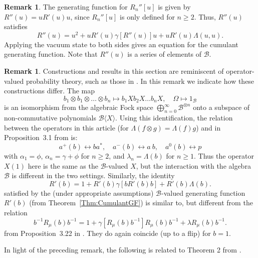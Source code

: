 \documentclass[12pt]{amsart}
\theoremstyle{definition}
\newtheorem{Remark}[Thm]{Remark}
\newcommand{\mc}[1]{\mathcal{#1}}
\begin{document}
\begin{Remark}
The generating function for $R_n''[u]$ is given by $R''(u) = uR'(u) u$, since $R_n''[u]$ is only defined for $n\geq 2$. Thus, $R''(u)$ satisfies
	\begin{equation}
	R''(u) = u^2 + u R'(u) \gamma\left[ R''(u) \right] u + u R'(u) \Lambda(u, u).
	\end{equation}
	Applying the vacuum state to both sides gives an equation for the cumulant generating function. Note that $R''(u)$ is a series of elements of $\mc{B}$.
\end{Remark}


\begin{Remark}\label{Rmk:Ans-Williams-Jacobi-comparison}
Constructions and results in this section are reminiscent of operator-valued probability theory, such as those in \cite{Ans-Williams-Jacobi}. In this remark we indicate how these constructions differ. The map
\[
b_1 \otimes b_1 \otimes \ldots \otimes b_n \mapsto b_1 X b_2 X \ldots b_n X, \quad \Omega \mapsto 1_{\mc{B}}
\]
is an isomorphism from the algebraic Fock space $\bigoplus_{n=0}^\infty \mc{B}^{\otimes n}$ onto a subspace of non-commutative polynomials $\mc{B} \langle X \rangle$. Using this identification, the relation between the operators in this article (for $\Lambda(f \otimes g) = \Lambda(f) g$) and in Proposition~3.1 from \cite{Ans-Williams-Jacobi} is:
\[
a^+(b) \leftrightarrow b a^\ast, \quad a^-(b) \leftrightarrow a \ b, \quad a^0(b) \leftrightarrow p
\]
with $\alpha_1 = \phi$, $\alpha_n = \gamma + \phi$ for $n \geq 2$, and $\lambda_n = \Lambda(b)$ for $n \geq 1$. Thus the operator $X(1)$ here is the same as the $\mc{B}$-valued $X$, but the interaction with the algebra $\mc{B}$ is different in the two settings. Similarly, the identity
\begin{equation*}
	R'(b) = 1 + R'(b)\gamma\left[ b R'(b)b \right] + R'(b) \Lambda(b).
	\end{equation*}
satisfied by the (under appropriate assumptions) $\mc{B}$-valued generating function $R'(b)$ (from Theorem~\ref{Thm:CumulantGF}) is similar to, but different from the relation
\[
b^{-1} R_\mu(b) b^{-1} = 1 + \gamma[R_\mu(b)b^{-1}]R_\mu(b)b^{-1} + \lambda R_\mu(b)b^{-1}.
\]
from Proposition~3.22 in \cite{Ans-Williams-Jacobi}. They do again coincide (up to a flip) for $b = 1$.
\end{Remark}


In light of the preceding remark, the following is related to Theorem 2 from \cite{AnsFree-Meixner}.
\end{document}
